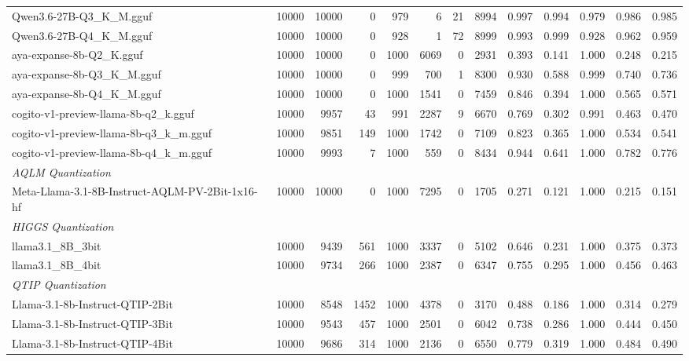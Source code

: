 \begin{table}[htbp]
{\begin{tabular}{lrrrrrrrrrrrr}
    Qwen3.6-27B-Q3\_K\_M.gguf & 10000 & 10000 & 0 & 979 & 6 & 21 & 8994 & 0.997 & 0.994 & 0.979 & 0.986 & 0.985 \\
    Qwen3.6-27B-Q4\_K\_M.gguf & 10000 & 10000 & 0 & 928 & 1 & 72 & 8999 & 0.993 & 0.999 & 0.928 & 0.962 & 0.959 \\
    aya-expanse-8b-Q2\_K.gguf & 10000 & 10000 & 0 & 1000 & 6069 & 0 & 2931 & 0.393 & 0.141 & 1.000 & 0.248 & 0.215 \\
    aya-expanse-8b-Q3\_K\_M.gguf & 10000 & 10000 & 0 & 999 & 700 & 1 & 8300 & 0.930 & 0.588 & 0.999 & 0.740 & 0.736 \\
    aya-expanse-8b-Q4\_K\_M.gguf & 10000 & 10000 & 0 & 1000 & 1541 & 0 & 7459 & 0.846 & 0.394 & 1.000 & 0.565 & 0.571 \\
    cogito-v1-preview-llama-8b-q2\_k.gguf & 10000 & 9957 & 43 & 991 & 2287 & 9 & 6670 & 0.769 & 0.302 & 0.991 & 0.463 & 0.470 \\
    cogito-v1-preview-llama-8b-q3\_k\_m.gguf & 10000 & 9851 & 149 & 1000 & 1742 & 0 & 7109 & 0.823 & 0.365 & 1.000 & 0.534 & 0.541 \\
    cogito-v1-preview-llama-8b-q4\_k\_m.gguf & 10000 & 9993 & 7 & 1000 & 559 & 0 & 8434 & 0.944 & 0.641 & 1.000 & 0.782 & 0.776 \\
    \midrule
    \multicolumn{13}{l}{\textit{AQLM Quantization}} \\
    \midrule
    Meta-Llama-3.1-8B-Instruct-AQLM-PV-2Bit-1x16-hf & 10000 & 10000 & 0 & 1000 & 7295 & 0 & 1705 & 0.271 & 0.121 & 1.000 & 0.215 & 0.151 \\
    \midrule
    \multicolumn{13}{l}{\textit{HIGGS Quantization}} \\
    \midrule
    llama3.1\_8B\_3bit & 10000 & 9439 & 561 & 1000 & 3337 & 0 & 5102 & 0.646 & 0.231 & 1.000 & 0.375 & 0.373 \\
    llama3.1\_8B\_4bit & 10000 & 9734 & 266 & 1000 & 2387 & 0 & 6347 & 0.755 & 0.295 & 1.000 & 0.456 & 0.463 \\
    \midrule
    \multicolumn{13}{l}{\textit{QTIP Quantization}} \\
    \midrule
    Llama-3.1-8b-Instruct-QTIP-2Bit & 10000 & 8548 & 1452 & 1000 & 4378 & 0 & 3170 & 0.488 & 0.186 & 1.000 & 0.314 & 0.279 \\
    Llama-3.1-8b-Instruct-QTIP-3Bit & 10000 & 9543 & 457 & 1000 & 2501 & 0 & 6042 & 0.738 & 0.286 & 1.000 & 0.444 & 0.450 \\
    Llama-3.1-8b-Instruct-QTIP-4Bit & 10000 & 9686 & 314 & 1000 & 2136 & 0 & 6550 & 0.779 & 0.319 & 1.000 & 0.484 & 0.490 \\

\end{tabular}}
\end{table}
